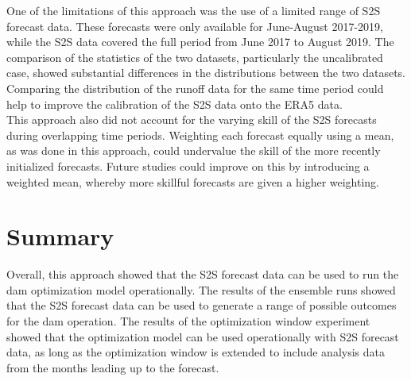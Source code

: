 \documentclass[11pt]{article}
\begin{document}

One of the limitations of this approach was the use of a limited range of S2S forecast data. These forecasts were only available for June-August 2017-2019, while the S2S data covered the full period from June 2017 to August 2019. The comparison of the statistics of the two datasets, particularly the uncalibrated case, showed substantial differences in the distributions between the two datasets. Comparing the distribution of the runoff data for the same time period could help to improve the calibration of the S2S data onto the ERA5 data.\\

This approach also did not account for the varying skill of the S2S forecasts during overlapping time periods. Weighting each forecast equally using a mean, as was done in this approach, could undervalue the skill of the more recently initialized forecasts. Future studies could improve on this by introducing a weighted mean, whereby more skillful forecasts are given a higher weighting.\\

\section*{Summary}

Overall, this approach showed that the S2S forecast data can be used to run the dam optimization model operationally. The results of the ensemble runs showed that the S2S forecast data can be used to generate a range of possible outcomes for the dam operation. The results of the optimization window experiment showed that the optimization model can be used operationally with S2S forecast data, as long as the optimization window is extended to include analysis data from the months leading up to the forecast.\\


\printbibliography
\end{document}
